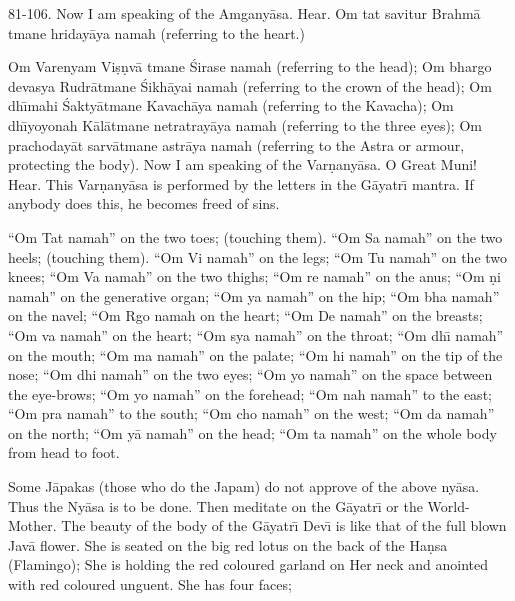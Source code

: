 81-106. Now I am speaking of the Amgany\=asa. Hear. Om tat savitur Brahm\=a tmane hriday\=aya namah (referring to the heart.)

Om Varenyam Vi\d{s}\d{n}v\=a tmane \'Sirase namah (referring to the head); Om bhargo devasya Rudr\=atmane \'Sikh\=ayai namah (referring to the crown of the head); Om dh\={\i}mahi \'Sakty\=atmane Kavach\=aya namah (referring to the Kavacha); Om dh\={\i}yoyonah K\=al\=atmane netratray\=aya namah (referring to the three eyes); Om prachoday\=at sarv\=atmane astr\=aya namah (referring to the Astra or armour, protecting the body). Now I am speaking of the Var\d{n}any\=asa. O Great Muni! Hear. This Var\d{n}any\=asa is performed by the letters in the G\=ayatr\={\i} mantra. If anybody does this, he becomes freed of sins.

``Om Tat namah'' on the two toes; (touching them).
``Om Sa namah'' on the two heels; (touching them).
``Om Vi namah'' on the legs;
``Om Tu namah'' on the two knees;
``Om Va namah'' on the two thighs;
``Om re namah'' on the anus;
``Om \d{n}i namah'' on the generative organ;
``Om ya namah'' on the hip;
``Om bha namah'' on the navel;
``Om Rgo namah on the heart;
``Om De namah'' on the breasts;
``Om va namah'' on the heart;
``Om sya namah'' on the throat;
``Om dh\={\i} namah'' on the mouth;
``Om ma namah'' on the palate;
``Om hi namah'' on the tip of the nose;
``Om dhi namah'' on the two eyes;
``Om yo namah'' on the space between the eye-brows;
``Om yo namah'' on the forehead;
``Om nah namah'' to the east;
``Om pra namah'' to the south;
``Om cho namah'' on the west;
``Om da namah'' on the north;
``Om y\=a namah'' on the head;
``Om ta namah'' on the whole body from head to foot.

Some J\=apakas (those who do the Japam) do not approve of the above ny\=asa. Thus the Ny\=asa is to be done. Then meditate on the G\=ayatr\={\i} or the World-Mother. The beauty of the body of the G\=ayatr\={\i} Dev\={\i} is like that of the full blown Jav\=a flower. She is seated on the big red lotus on the back of the Ha\d{n}sa (Flamingo); She is holding the red coloured garland on Her neck and anointed with red coloured unguent. She has four faces;

